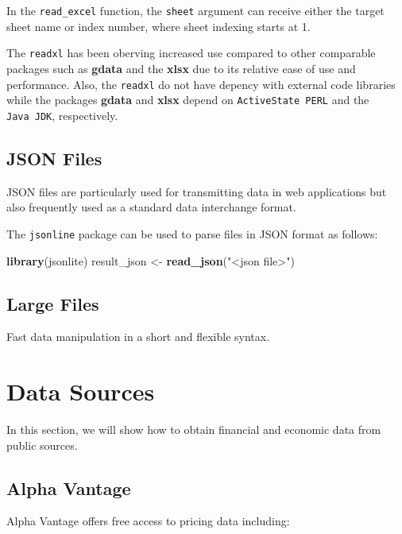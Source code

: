 \documentclass[]{book}
\newenvironment{Shaded}{\begin{snugshade}}{\end{snugshade}}
\newcommand{\KeywordTok}[1]{\textcolor[rgb]{0.13,0.29,0.53}{\textbf{#1}}}
\newcommand{\StringTok}[1]{\textcolor[rgb]{0.31,0.60,0.02}{#1}}
\newcommand{\NormalTok}[1]{#1}
\theoremstyle{definition}
\theoremstyle{definition}
\theoremstyle{definition}
\theoremstyle{remark}
\begin{document}
In the \texttt{read\_excel} function, the \texttt{sheet} argument can
receive either the target sheet name or index number, where sheet
indexing starts at 1.

The \texttt{readxl} has been oberving increased use compared to other
comparable packages such as \textbf{gdata} and the \textbf{xlsx} due to
its relative ease of use and performance. Also, the \texttt{readxl} do
not have depency with external code libraries while the packages
\textbf{gdata} and \textbf{xlsx} depend on \texttt{ActiveState\ PERL}
and the \texttt{Java\ JDK}, respectively.

\subsection{JSON Files}\label{json-files}

JSON files are particularly used for transmitting data in web
applications but also frequently used as a standard data interchange
format.

The \texttt{jsonline} package can be used to parse files in JSON format
as follows:

\begin{Shaded}
\begin{Highlighting}[]
\KeywordTok{library}\NormalTok{(jsonlite)}
\NormalTok{result_json <-}\StringTok{ }\KeywordTok{read_json}\NormalTok{(}\StringTok{"<json file>"}\NormalTok{)}
\end{Highlighting}
\end{Shaded}

\subsection{Large Files}\label{large-files}

Fast data manipulation in a short and flexible syntax.

\section{Data Sources}\label{data-sources}

In this section, we will show how to obtain financial and economic data
from public sources.

\subsection{Alpha Vantage}\label{alpha-vantage}

Alpha Vantage offers free access to pricing data including:
\end{document}
